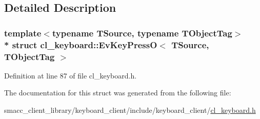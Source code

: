 \subsection{Detailed Description}
\subsubsection*{template$<$typename T\+Source, typename T\+Object\+Tag$>$\\*
struct cl\+\_\+keyboard\+::\+Ev\+Key\+Press\+O$<$ T\+Source, T\+Object\+Tag $>$}



Definition at line 87 of file cl\+\_\+keyboard.\+h.



The documentation for this struct was generated from the following file\+:\begin{DoxyCompactItemize}
\item 
smacc\+\_\+client\+\_\+library/keyboard\+\_\+client/include/keyboard\+\_\+client/\hyperlink{cl__keyboard_8h}{cl\+\_\+keyboard.\+h}\end{DoxyCompactItemize}
